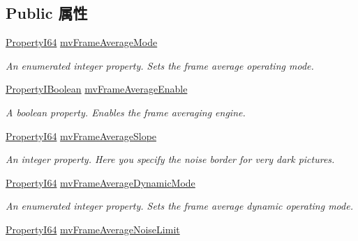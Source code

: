\subsection*{Public 属性}
\begin{DoxyCompactItemize}
\item 
\hyperlink{group___common_interface_ga81749b2696755513663492664a18a893}{Property\+I64} \hyperlink{classmv_i_m_p_a_c_t_1_1acquire_1_1_gen_i_cam_1_1mv_frame_average_control_acb77674635dac0f573c9b900d449dd8c}{mv\+Frame\+Average\+Mode}
\begin{DoxyCompactList}\small\item\em An enumerated integer property. Sets the frame average operating mode. \end{DoxyCompactList}\item 
\hyperlink{group___common_interface_ga44f9437e24b21b6c93da9039ec6786aa}{Property\+I\+Boolean} \hyperlink{classmv_i_m_p_a_c_t_1_1acquire_1_1_gen_i_cam_1_1mv_frame_average_control_ac1a35605c2a85004a22af0efc0c5161a}{mv\+Frame\+Average\+Enable}
\begin{DoxyCompactList}\small\item\em A boolean property. Enables the frame averaging engine. \end{DoxyCompactList}\item 
\hyperlink{group___common_interface_ga81749b2696755513663492664a18a893}{Property\+I64} \hyperlink{classmv_i_m_p_a_c_t_1_1acquire_1_1_gen_i_cam_1_1mv_frame_average_control_a5007bc8f63e6636ba4b9b861226d9c5c}{mv\+Frame\+Average\+Slope}
\begin{DoxyCompactList}\small\item\em An integer property. Here you specify the noise border for very dark pictures. \end{DoxyCompactList}\item 
\hyperlink{group___common_interface_ga81749b2696755513663492664a18a893}{Property\+I64} \hyperlink{classmv_i_m_p_a_c_t_1_1acquire_1_1_gen_i_cam_1_1mv_frame_average_control_a1b2eefa6cd21b59884cfc889c95cbd94}{mv\+Frame\+Average\+Dynamic\+Mode}
\begin{DoxyCompactList}\small\item\em An enumerated integer property. Sets the frame average dynamic operating mode. \end{DoxyCompactList}\item 
\hyperlink{group___common_interface_ga81749b2696755513663492664a18a893}{Property\+I64} \hyperlink{classmv_i_m_p_a_c_t_1_1acquire_1_1_gen_i_cam_1_1mv_frame_average_control_a9a3013a03a3e271aa1ec174b3804666a}{mv\+Frame\+Average\+Noise\+Limit}

\end{DoxyCompactItemize}
